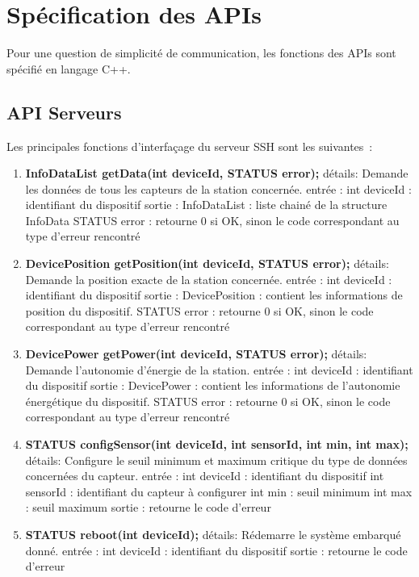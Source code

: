 \section{Spécification des APIs}

Pour une question de simplicité de communication, les fonctions des APIs sont spécifié en langage C++.

\subsection{API Serveurs}
Les principales fonctions d'interfaçage du serveur SSH sont les suivantes :

\begin{enumerate}
\item \textbf{InfoDataList getData(int deviceId, STATUS error);}
détails:
		Demande les données de tous les capteurs de la station concernée.
entrée : 
		int deviceId : identifiant du dispositif
sortie :
		InfoDataList : liste chainé de la structure InfoData
		STATUS error : retourne 0 si OK, sinon le code correspondant au type d'erreur rencontré

\item \textbf{DevicePosition getPosition(int deviceId, STATUS error);}
détails:
		Demande la position exacte de la station concernée.
entrée : 
		int deviceId : identifiant du dispositif
sortie :
		DevicePosition : contient les informations de position du dispositif.
		STATUS error : retourne 0 si OK, sinon le code correspondant au type d'erreur rencontré

\item \textbf{DevicePower getPower(int deviceId, STATUS error);}
détails:
		Demande l’autonomie d'énergie de la station.
entrée : 
		int deviceId : identifiant du dispositif
sortie :
		DevicePower : contient les informations de l’autonomie énergétique du dispositif.
		STATUS error : retourne 0 si OK, sinon le code correspondant au type d'erreur rencontré

\item \textbf{STATUS configSensor(int deviceId, int sensorId, int min, int max);}
détails:
		Configure le seuil minimum et maximum critique du type de données concernées du capteur.
entrée :
		int deviceId : identifiant du dispositif
		int sensorId : identifiant du capteur à configurer
		int min : seuil minimum
		int max : seuil maximum
sortie :
		retourne le code d'erreur

\item \textbf{STATUS reboot(int deviceId);}
détails:
		Rédemarre le système embarqué donné.
entrée :
		int deviceId : identifiant du dispositif
sortie :
		retourne le code d'erreur


\end{enumerate}
